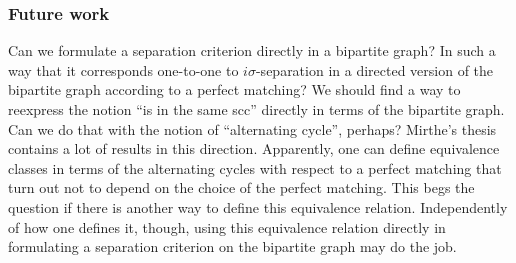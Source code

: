 \subsubsection{Future work}

Can we formulate a separation criterion directly in a bipartite graph?
In such a way that it corresponds one-to-one to $i\sigma$-separation in a directed version of the bipartite graph according to a perfect matching? 
We should find a way to reexpress the notion ``is in the same scc'' directly in terms of the bipartite graph. 
Can we do that with the notion of ``alternating cycle'', perhaps? Mirthe's thesis contains a lot of results in this direction.
Apparently, one can define equivalence classes in terms of the alternating cycles with respect to a perfect matching that turn
out not to depend on the choice of the perfect matching. This begs the question if there is another way to define this equivalence
relation. Independently of how one defines it, though, using this equivalence relation directly in formulating a separation 
criterion on the bipartite graph may do the job.


